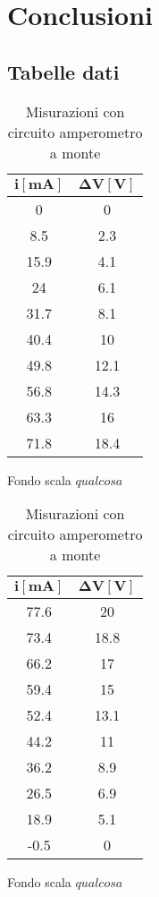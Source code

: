 \documentclass[12pt]{article}
\begin{document}
\section{Conclusioni}

\newpage
\begin{appendices}
\section{Tabelle dati}
\begin{table}[H]
\centering

  \begin{subtable}{.5\textwidth}
    \centering
    \begin{tabular}{|c|c|} \hline
     $\mathbf{i {[mA]}}$  & $\mathbf{\Delta V [V]}$  \\ \hline
      0 & 0  \\ \hline
      8.5 & 2.3  \\ \hline
      15.9 & 4.1  \\ \hline
      24 & 6.1  \\ \hline
      31.7 & 8.1  \\ \hline
      40.4 & 10  \\ \hline
      49.8 & 12.1  \\ \hline
      56.8 & 14.3  \\ \hline
      63.3 & 16  \\ \hline
      71.8 & 18.4  \\ \hline
    \end{tabular}
    \caption{Fondo scala $qualcosa$}
  \end{subtable}%
  \begin{subtable}{.5\textwidth}
  \centering
  \begin{tabular}{|c|c|} \hline
  $\mathbf{i {[mA]}}$  & $\mathbf{\Delta V [V]}$  \\ \hline
    77.6 & 20  \\ \hline
    73.4 & 18.8  \\ \hline
    66.2 & 17  \\ \hline
    59.4 & 15  \\ \hline
    52.4 & 13.1  \\ \hline
    44.2 & 11  \\ \hline
    36.2 & 8.9  \\ \hline
    26.5 & 6.9  \\ \hline
    18.9 & 5.1  \\ \hline
    -0.5 & 0  \\ \hline
  \end{tabular}
  \caption{Fondo scala $qualcosa$}
\end{subtable}
\caption{Misurazioni con circuito amperometro a monte}
\end{table}
\begin{table}[H]
\centering


\end{table}
\end{appendices}
\end{document}
